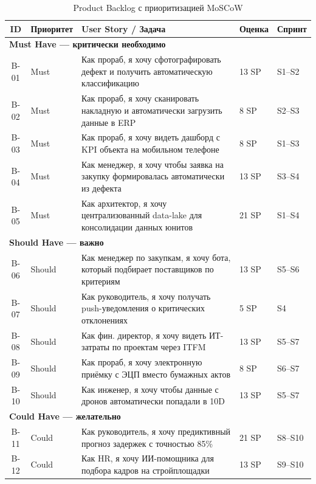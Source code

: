 \documentclass[12pt,a4paper]{article}
\begin{document}
\begin{table}[H]
\centering
\caption{Product Backlog с приоритизацией MoSCoW}
\label{tab:backlog}
\small
\begin{tabularx}{\textwidth}{|c|l|X|l|l|}
\hline
\rowcolor{samoletlight}
\textbf{ID} & \textbf{Приоритет} & \textbf{User Story / Задача} & \textbf{Оценка} & \textbf{Спринт} \\
\hline
\multicolumn{5}{|l|}{\cellcolor{accentred!12}\textbf{Must Have --- критически необходимо}} \\
\hline
B-01 & Must & Как прораб, я хочу сфотографировать дефект и получить автоматическую классификацию & 13 SP & S1--S2 \\
\hline
B-02 & Must & Как прораб, я хочу сканировать накладную и автоматически загрузить данные в ERP & 8 SP & S2--S3 \\
\hline
B-03 & Must & Как прораб, я хочу видеть дашборд с KPI объекта на мобильном телефоне & 8 SP & S1--S3 \\
\hline
B-04 & Must & Как менеджер, я хочу чтобы заявка на закупку формировалась автоматически из дефекта & 13 SP & S3--S4 \\
\hline
B-05 & Must & Как архитектор, я хочу централизованный data-lake для консолидации данных юнитов & 21 SP & S1--S4 \\
\hline
\multicolumn{5}{|l|}{\cellcolor{accentorange!12}\textbf{Should Have --- важно}} \\
\hline
B-06 & Should & Как менеджер по закупкам, я хочу бота, который подбирает поставщиков по критериям & 13 SP & S5--S6 \\
\hline
B-07 & Should & Как руководитель, я хочу получать push-уведомления о критических отклонениях & 5 SP & S4 \\
\hline
B-08 & Should & Как фин. директор, я хочу видеть ИТ-затраты по проектам через ITFM & 13 SP & S5--S7 \\
\hline
B-09 & Should & Как прораб, я хочу электронную приёмку с ЭЦП вместо бумажных актов & 8 SP & S6--S7 \\
\hline
B-10 & Should & Как инженер, я хочу чтобы данные с дронов автоматически попадали в 10D & 13 SP & S5--S7 \\
\hline
\multicolumn{5}{|l|}{\cellcolor{accentgreen!12}\textbf{Could Have --- желательно}} \\
\hline
B-11 & Could & Как руководитель, я хочу предиктивный прогноз задержек с точностью 85\% & 21 SP & S8--S10 \\
\hline
B-12 & Could & Как HR, я хочу ИИ-помощника для подбора кадров на стройплощадки & 13 SP & S9--S10 \\

\end{tabularx}
\end{table}
\end{document}
